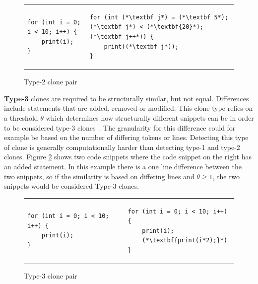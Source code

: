 \begin{figure}[t]
	\begin{center}
        \begin{tabular}{p{5.1cm} | p{5.1cm}}
\begin{lstlisting}
for (int i = 0; i < 10; i++) {
    print(i);
}
\end{lstlisting} & \begin{lstlisting}
for (int (*\textbf j*) = (*\textbf 5*); (*\textbf j*) < (*\textbf{20}*); (*\textbf j++*)) {
    print((*\textbf j*));
}
\end{lstlisting}
		\end{tabular}
	\end{center}
	\caption{Type-2 clone pair}
	\label{fig:type2clone}
\end{figure}

\textbf{Type-3} clones are required to be structurally similar, but not equal. Differences
include statements that are added, removed or modified. This clone type relies on a
threshold $\theta$ which determines how structurally different snippets can be in order to
be considered type-3 clones~\cite[6]{Inoue_introduction_to_cc}. The granularity for this
difference could for example be based on the number of differing tokens or lines.
Detecting this type of clone is generally computationally harder than detecting type-1 and
type-2 clones. Figure \ref{fig:type3clone} shows two code snippets where the code snippet
on the right has an added statement. In this example there is a one line difference
between the two snippets, so if the similarity is based on differing lines and $\theta
\geq 1$, the two snippets would be considered Type-3 clones.

\begin{figure}[t]
	\begin{center}
        \begin{tabular}{p{5.1cm} | p{5.1cm}}
			\begin{lstlisting}
for (int i = 0; i < 10; i++) {
    print(i);
}
\end{lstlisting} &
			\begin{lstlisting}
for (int i = 0; i < 10; i++) {
    print(i);
    (*\textbf{print(i*2);}*)
}
\end{lstlisting}
		\end{tabular}
	\end{center}
    \caption{Type-3 clone pair}
    \label{fig:type3clone}
\end{figure}

